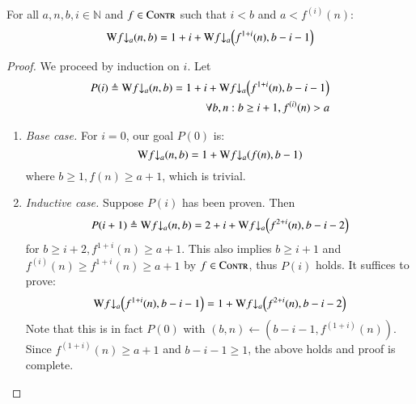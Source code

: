 \begin{lem} \label{lem: cdt-intermediate}
For all $a, n, b, i\in \mathbb{N}$ and $f \in \text{\scshape{Contr}}$ such that $i < b$ and $a < f^{(i)}(n)$:
\begin{equation}  \label{eq: cdt-intermediate}
\W\cdt{f}{a}(n, b) = 1 + i + \W\cdt{f}{a}\left(f^{1+i}(n), b - i - 1\right)
\end{equation}
\end{lem}
\begin{proof}
We proceed by induction on $i$. Let
$$\begin{aligned}
 P(i) \triangleq \W\cdt{f}{a}(n, b) = 1 + i + \W\cdt{f}{a}\left(f^{1+i}(n), b - i - 1\right) \\ \forall b, n : b\ge i+1, f^{(i)}(n) > a
\end{aligned}$$
\begin{enumerate}[leftmargin=*]
	\item \textit{Base case.} For $i = 0$, our goal $P(0)$ is:
	$$ \W\cdt{f}{a}(n, b) = 1 + \W\cdt{f}{a}\left(f(n), b - 1\right) $$
	where $b \ge 1, f(n)\ge a+1$, which is trivial.
	\item \textit{Inductive case.} Suppose $P(i)$ has been proven. Then
	$$ P(i+1) \triangleq \W\cdt{f}{a}(n, b) = 2 + i + \W\cdt{f}{a}\left( f^{2+i}(n), b - i - 2 \right)$$
	for $b \ge i+2, f^{1+i}(n) \ge a+1$. This also implies $b\ge i+1$ and $\displaystyle f^{(i)}(n) \ge f^{1+i}(n)\ge a+1$ by $f\in \text{\scshape{Contr}}$, thus $P(i)$ holds. It suffices to prove:
	$$ \W\cdt{f}{a}\left(f^{1+i}(n), b-i-1\right) = 1 + \W\cdt{f}{a}\left( f^{2+i}(n), b-i-2 \right)$$
	Note that this is in fact $P(0)$ with $(b, n) \leftarrow \left(b-i-1, f^{(1+i)}(n)\right)$. Since $f^{(1+i)}(n) \ge a+1$ and $b-i-1\ge 1$, the above holds and proof is complete. 
\end{enumerate}
\end{proof}

